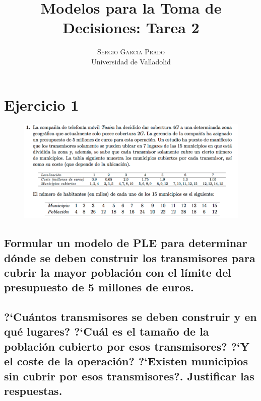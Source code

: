 \documentclass[10pt, a4paper]{article}
\title{\vspace{-15mm}\fontsize{24pt}{10pt}\selectfont\textbf{Modelos para la Toma de Decisiones: Tarea 2}} %
\author{
\large
\textsc{Sergio García Prado}\\[2mm] %
\normalsize Universidad de Valladolid \\ %
\vspace{-5mm}
}
\date{}
\begin{document}
	\maketitle %

	\thispagestyle{fancy} %


    \section{Ejercicio 1}

        \begin{figure}[H]
        \centering
            \includegraphics[width=\textwidth]{res/exercise-1.png}
        \end{figure}


		\subsection{Formular un modelo de PLE para determinar dónde se deben construir los transmisores para cubrir la mayor población con el límite del presupuesto de 5 millones de euros.}

			\paragraph{}

		\subsection{?`Cuántos transmisores se deben construir y en qué lugares? ?`Cuál es el tamaño de la población cubierto por esos transmisores? ?`Y el coste de la operación? ?`Existen municipios sin cubrir por esos transmisores?. Justificar las respuestas.}
\end{document}
